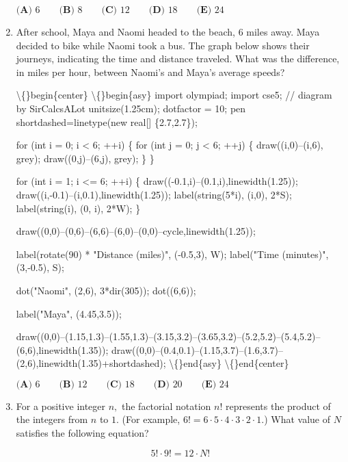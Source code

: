 \documentclass{article}
\begin{document}
\begin{enumerate}[label=\arabic*., itemsep=0.5em]
\(\textbf{(A) }6 \qquad \textbf{(B) }8 \qquad \textbf{(C) }12 \qquad \textbf{(D) }18 \qquad \textbf{(E) }24\)\par \vspace{0.5em}\item After school, Maya and Naomi headed to the beach, \(6\) miles away. Maya decided to bike while Naomi took a bus. The graph below shows their journeys, indicating the time and distance traveled. What was the difference, in miles per hour, between Naomi's and Maya's average speeds?


\textbackslash\{\}begin\{center\}
\textbackslash\{\}begin\{asy\}
import olympiad;
import cse5;
// diagram by SirCalcsALot
unitsize(1.25cm);
dotfactor = 10;
pen shortdashed=linetype(new real[] \{2.7,2.7\});

for (int i = 0; i < 6; ++i) \{
    for (int j = 0; j < 6; ++j) \{
        draw((i,0)--(i,6), grey);
        draw((0,j)--(6,j), grey);
    \}
\}

for (int i = 1; i <= 6; ++i) \{
    draw((-0.1,i)--(0.1,i),linewidth(1.25));
    draw((i,-0.1)--(i,0.1),linewidth(1.25));
    label(string(5*i), (i,0), 2*S);
    label(string(i), (0, i), 2*W); 
\}

draw((0,0)--(0,6)--(6,6)--(6,0)--(0,0)--cycle,linewidth(1.25));

label(rotate(90) * "Distance (miles)", (-0.5,3), W);
label("Time (minutes)", (3,-0.5), S);

dot("Naomi", (2,6), 3*dir(305));
dot((6,6));

label("Maya", (4.45,3.5));

draw((0,0)--(1.15,1.3)--(1.55,1.3)--(3.15,3.2)--(3.65,3.2)--(5.2,5.2)--(5.4,5.2)--(6,6),linewidth(1.35));
draw((0,0)--(0.4,0.1)--(1.15,3.7)--(1.6,3.7)--(2,6),linewidth(1.35)+shortdashed);
\textbackslash\{\}end\{asy\}
\textbackslash\{\}end\{center\}


\(\textbf{(A) }6 \qquad \textbf{(B) }12 \qquad \textbf{(C) }18 \qquad \textbf{(D) }20 \qquad \textbf{(E) }24\)\par \vspace{0.5em}\item For a positive integer \(n,\) the factorial notation \(n!\) represents the product of the integers
from \(n\) to \(1\). (For example, \(6! = 6 \cdot 5 \cdot 4 \cdot 3 \cdot 2 \cdot 1\).) What value of \(N\) satisfies the following equation?

\begin{equation*}
5! \cdot 9! = 12 \cdot N!
\end{equation*}


\end{enumerate}
\end{document}
